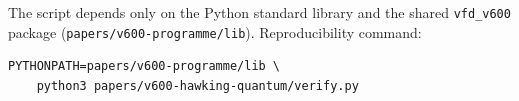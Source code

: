 \documentclass[11pt]{article}
\begin{document}
The script depends only on the Python standard library and the shared
\texttt{vfd\_v600} package
(\texttt{papers/v600-programme/lib}). Reproducibility command:
\begin{verbatim}
PYTHONPATH=papers/v600-programme/lib \
    python3 papers/v600-hawking-quantum/verify.py
\end{verbatim}



\end{document}
